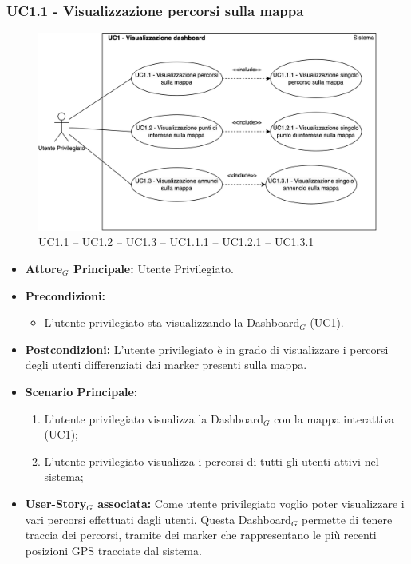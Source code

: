 \documentclass[11pt]{article}
\begin{document}
\begin{justify}
\subsubsection{\textbf{UC1.1 - Visualizzazione percorsi sulla mappa}}
\begin{figure}[H]
    \centering
    \includegraphics[width=0.7\linewidth]{UC1.123image.png}
    \caption{ UC1.1 -- UC1.2 -- UC1.3 -- UC1.1.1 -- UC1.2.1 -- UC1.3.1}
    \label{fig:UC1.1}
\end{figure}
\label{UC1.1}
\begin{itemize}
     \item \textbf{Attore$_G$ Principale:} Utente Privilegiato.
     \item \textbf{Precondizioni:}
        \begin{itemize}
    		\item L'utente privilegiato sta visualizzando la Dashboard$_G$ (UC1).
        \end{itemize}
     \item \textbf{Postcondizioni:} L'utente privilegiato è in grado di visualizzare i percorsi degli utenti differenziati dai marker presenti sulla mappa.
     \item \textbf{Scenario Principale:}
        \begin{enumerate}
            \item L'utente privilegiato visualizza la Dashboard$_G$ con la mappa interattiva (UC1);
            \item L'utente privilegiato visualizza i percorsi di tutti gli utenti attivi nel sistema;
        \end{enumerate}
     \item \textbf{User-Story$_G$ associata:}
     Come utente privilegiato voglio poter visualizzare i vari percorsi effettuati dagli utenti. Questa Dashboard$_G$ permette di tenere traccia dei percorsi, tramite dei marker che rappresentano le più recenti posizioni GPS tracciate dal sistema.
\end{itemize}

\end{justify}
\end{document}
